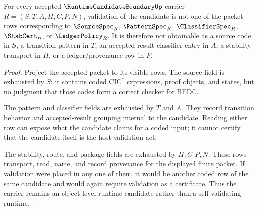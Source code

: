 \begin{theorem}
\label{thm:runtime-candidate-boundary-nonvalidation}
For every accepted $\RuntimeCandidateBoundaryUp$ carrier $R=(S,T,A,H,C,P,N)$, validation of the candidate is not one of the packet rows corresponding to $\SourceSpec_R$, $\PatternSpec_R$, $\ClassifierSpec_R$, $\StabCert_R$, or $\LedgerPolicy_R$. It is therefore not obtainable as a source code in $S$, a transition pattern in $T$, an accepted-result classifier entry in $A$, a stability transport in $H$, or a ledger/provenance row in $P$.
\end{theorem}
\begin{proof}
Project the accepted packet to its visible rows. The source field is exhausted by $S$: it contains coded $\mathrm{CIC}^{*}$ expressions, proof objects, and states, but no judgment that those codes form a correct checker for BEDC.

The pattern and classifier fields are exhausted by $T$ and $A$. They record transition behavior and accepted-result grouping internal to the candidate. Reading either row can expose what the candidate claims for a coded input; it cannot certify that the candidate itself is the host validation act.

The stability, route, and package fields are exhausted by $H,C,P,N$. These rows transport, read, name, and record provenance for the displayed finite packet. If validation were placed in any one of them, it would be another coded row of the same candidate and would again require validation as a certificate. Thus the carrier remains an object-level runtime candidate rather than a self-validating runtime.
\end{proof}

